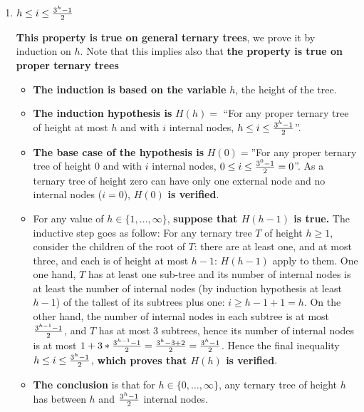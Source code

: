 \begin{enumerate}

\item $h\leq i \leq {3^h-1\over 2}$ 
\begin{solution}

{\bf This property is true on general ternary trees}, we prove it by
induction on $h$. Note that this implies also that {\bf the property
is true on proper ternary trees}

\begin{itemize}

\item {\bf The induction is based on the variable} $h$, the height of
the tree.

\item {\bf The induction hypothesis is} $H(h)=$ ``For any proper
ternary tree of height at most $h$ and with $i$ internal nodes,
%
$h\leq i \leq {3^h-1\over2}$''.

\item {\bf The base case of the hypothesis is} $H(0)=$''For any proper
ternary tree of height $0$ and with $i$ internal nodes,
$0\leq{i}\leq {3^0-1\over2}=0$''.
%
As a ternary tree of height zero can have only one external node and
no internal nodes ($i=0$), $H(0)$ {\bf is verified}.

\item For any value of $h\in\{1,\ldots,\infty\}$, {\bf suppose that
$H(h-1)$ is true.}  The inductive step goes as follow:
%
For any ternary tree $T$ of height $h\geq1$, consider the children of
the root of $T$: there are at least one, and at most three, and each
is of height at most $h-1$: $H(h-1)$ apply to them.
%
One one hand, $T$ has at least one sub-tree and its number of internal
nodes is at least the number of internal nodes (by induction
hypothesis at least $h-1$) of the tallest of its subtrees plus one:
$i\geq h-1+1=h$.
%
On the other hand, the number of internal nodes in each subtree is at
most ${3^{h-1}-1\over 2}$, and $T$ has at most $3$ subtrees, hence its
number of internal nodes is at most 
$1+3*{3^{h-1}-1\over 2}
= {3^h-3+2\over2} 
= {3^h-1\over2}$.
%
Hence the final inequality $h\leq i \leq {3^{h}-1\over 2}$, {\bf which
proves that $H(h)$ is verified}.

\item {\bf The conclusion} is that for $h\in\{0,\ldots,\infty\}$, any
ternary tree of height $h$ has between $h$ and ${3^h-1}\over2$ internal nodes.


\end{itemize}
\end{solution}
\end{enumerate}
